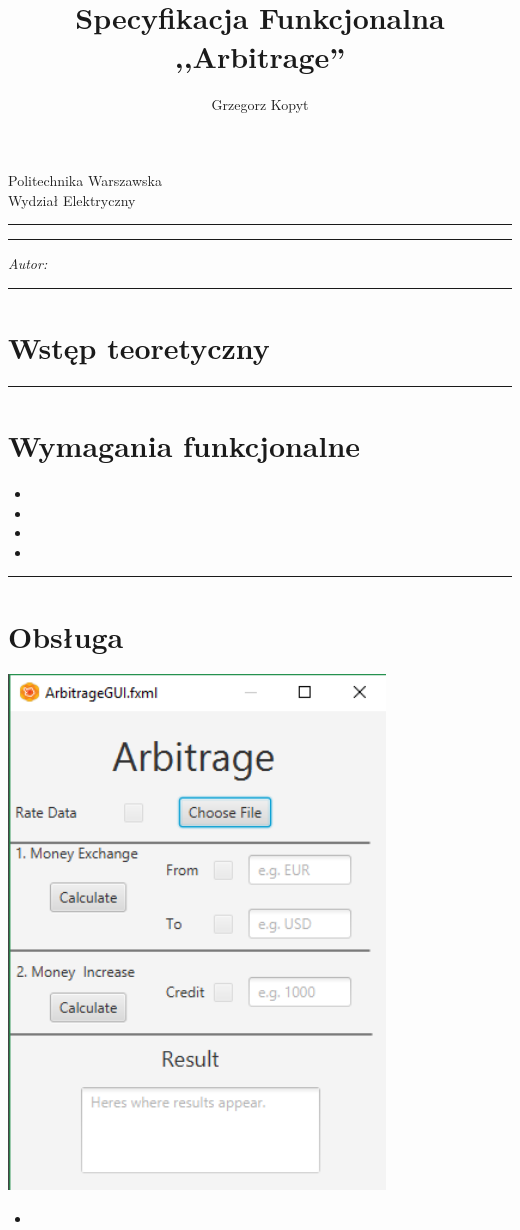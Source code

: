 \documentclass[a4paper,11pt]{article}
\author{Grzegorz Kopyt}
\title{Specyfikacja Funkcjonalna \\
,,Arbitrage''}
\makeatletter
\newcommand{\linia}{\rule{\linewidth}{0.4mm}}
\renewcommand{\maketitle}{\begin{titlepage}
    \vspace*{2cm}
    \begin{center}\LARGE
    Politechnika Warszawska\\
    Wydział Elektryczny\\
    \end{center}
    \vspace{5cm}
    \noindent\linia
    \begin{center}
      \LARGE \textsc{\@title}
         \end{center}
     \linia
    \vspace{0.5cm}
    \begin{flushright}
    \begin{minipage}{5cm}
    \textit{Autor:}\\
    \normalsize \textsc{\@author} \par
    \end{minipage}
    \vspace{5cm}
     \end{flushright}
    \vspace*{\stretch{6}}
    \begin{center}
    \@date
    \end{center}
  \end{titlepage}%
}
\makeatother
\begin{document}
\maketitle

\tableofcontents
\vspace{1cm}
\noindent\linia
\section{Wstęp teoretyczny}


\noindent\linia
\section{Wymagania funkcjonalne}
\begin{itemize}
\item 
\item 
\item 
\item 
\end{itemize}

\noindent\linia
\section{Obsługa}
\includegraphics[width=10cm]{ArbitrageGUI}

\begin{itemize}
\item 

\end{itemize}
\end{document}
